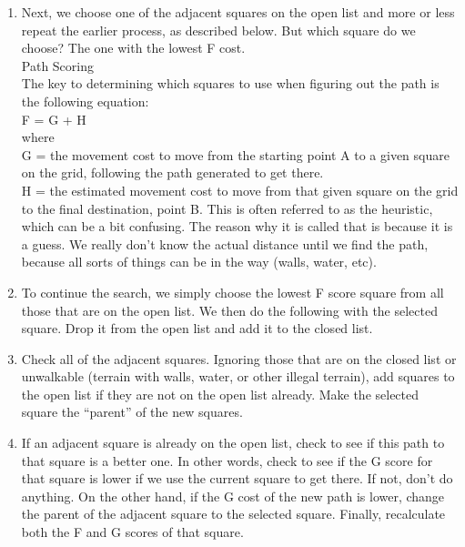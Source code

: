 \documentclass[twocolumn]{IEEEtran}
\begin{document}
\begin{enumerate}
\begin{enumerate}
    \item Next, we choose one of the adjacent squares on the open list and more or less repeat the earlier process, as described below. But which square do we choose? The one with the lowest F cost.\\

Path Scoring\\

The key to determining which squares to use when figuring out the path is the following equation:\\

F = G + H \\

where\\

G = the movement cost to move from the starting point A to a given square on the grid, following the path generated to get there.\\ 
H = the estimated movement cost to move from that given square on the grid to the final destination, point B. This is often referred to as the heuristic, which can be a bit confusing. The reason why it is called that is because it is a guess. We really don’t know the actual distance until we find the path, because all sorts of things can be in the way (walls, water, etc). 

	\item To continue the search, we simply choose the lowest F score square from all those that are on the open list. We then do the following with the selected square. Drop it from the open list and add it to the closed list.
    
    \item Check all of the adjacent squares. Ignoring those that are on the closed list or unwalkable (terrain with walls, water, or other illegal terrain), add squares to the open list if they are not on the open list already. Make the selected square the “parent” of the new squares.
    
    \item If an adjacent square is already on the open list, check to see if this path to that square is a better one. In other words, check to see if the G score for that square is lower if we use the current square to get there. If not, don’t do anything. 
    On the other hand, if the G cost of the new path is lower, change the parent of the adjacent square to the selected square. Finally, recalculate both the F and G scores of that square.\\


\end{enumerate}
\end{enumerate}
\end{document}
